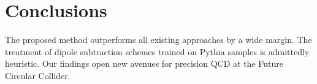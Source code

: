 \section{Conclusions}\label{sec:conclusions}

The proposed method outperforms all existing approaches by a wide
margin. The treatment of dipole subtraction schemes trained on Pythia
samples is admittedly heuristic. Our findings open new avenues for
precision QCD at the Future Circular Collider.

